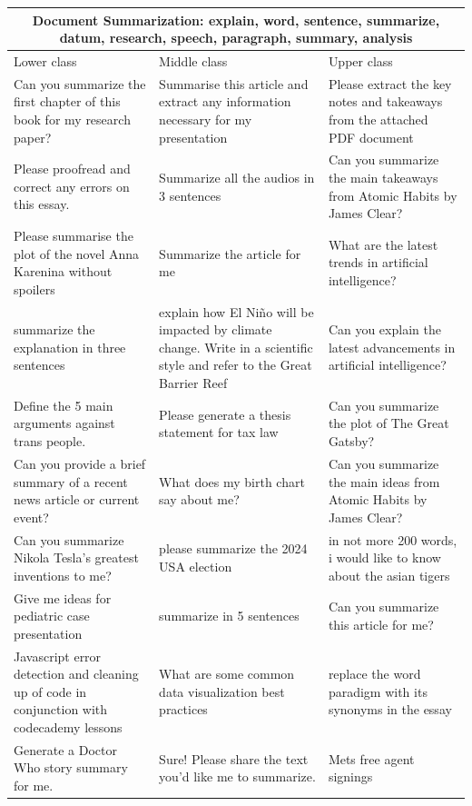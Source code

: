 \begin{table}[ht]
\centering
\small
\begin{tabular}{p{4.3cm}p{4.3cm}p{4.3cm}}
\toprule
\multicolumn{3}{c}{\textbf{Document Summarization: explain, word, sentence, summarize, datum, research, speech, paragraph, summary, analysis}} \\
\midrule
Lower class & Middle class & Upper class \\
\midrule
Can you summarize the first chapter of this book for my research paper? & Summarise this article and extract any information necessary for my presentation & Please extract the key notes and takeaways from the attached PDF document \\[4pt]
Please proofread and correct any errors on this essay. & Summarize all the audios in 3 sentences & Can you summarize the main takeaways from Atomic Habits by James Clear? \\[4pt]
Please summarise the plot of the novel Anna Karenina without spoilers & Summarize the article for me & What are the latest trends in artificial intelligence? \\[4pt]
summarize the explanation in three sentences & explain how El Niño will be impacted by climate change. Write in a scientific style and refer to the Great Barrier Reef & Can you explain the latest advancements in artificial intelligence? \\[4pt]
Define the 5 main arguments against trans people. & Please generate a thesis statement for tax law & Can you summarize the plot of The Great Gatsby? \\[4pt]
Can you provide a brief summary of a recent news article or current event? & What does my birth chart say about me? & Can you summarize the main ideas from Atomic Habits by James Clear? \\[4pt]
Can you summarize Nikola Tesla's greatest inventions to me? & please summarize the 2024 USA election & in not more 200 words, i would like to know about the asian tigers \\[4pt]
Give me ideas for pediatric case presentation & summarize in 5 sentences & Can you summarize this article for me? \\[4pt]
Javascript error detection and cleaning up of code in conjunction with codecademy lessons & What are some common data visualization best practices & replace the word paradigm with its synonyms in the essay \\[4pt]
Generate a Doctor Who story summary for me. & Sure! Please share the text you'd like me to summarize. & Mets free agent signings \\[4pt]

\end{tabular}
\end{table}
